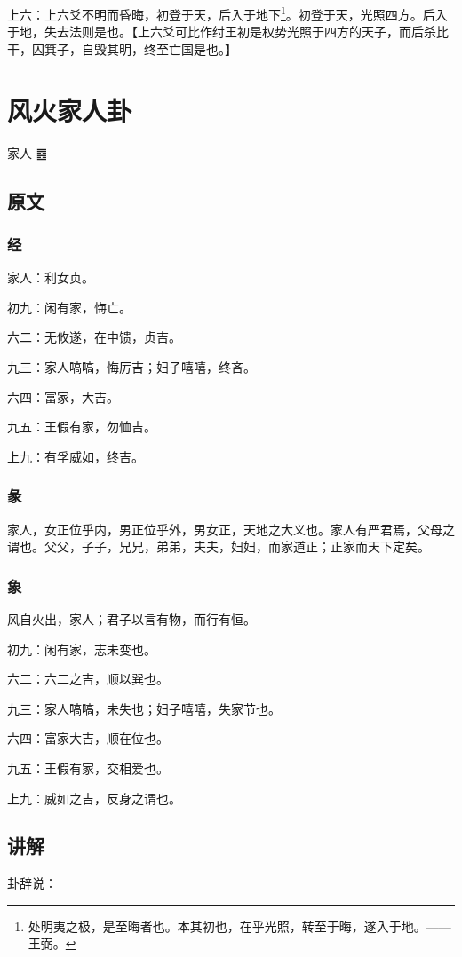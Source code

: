 \documentclass[12pt,oneside]{book}
\begin{document}
上六：上六爻不明而昏晦，初登于天，后入于地下\footnote{处明夷之极，是至晦者也。本其初也，在乎光照，转至于晦，遂入于地。——王弼。}。初登于天，光照四方。后入于地，失去法则是也。【上六爻可比作纣王初是权势光照于四方的天子，而后杀比干，囚箕子，自毁其明，终至亡国是也。】


\chapter{风火家人卦}
家人 {\Large ䷤}

\section{原文}

\subsection{经}
家人：利女贞。

初九：闲有家，悔亡。

六二：无攸遂，在中馈，贞吉。

九三：家人嗃嗃，悔厉吉；妇子嘻嘻，终吝。

六四：富家，大吉。

九五：王假有家，勿恤吉。

上九：有孚威如，终吉。

\subsection{彖}
家人，女正位乎内，男正位乎外，男女正，天地之大义也。家人有严君焉，父母之谓也。父父，子子，兄兄，弟弟，夫夫，妇妇，而家道正；正家而天下定矣。

\subsection{象}
风自火出，家人；君子以言有物，而行有恒。

初九：闲有家，志未变也。

六二：六二之吉，顺以巽也。

九三：家人嗃嗃，未失也；妇子嘻嘻，失家节也。

六四：富家大吉，顺在位也。

九五：王假有家，交相爱也。

上九：威如之吉，反身之谓也。

\section{讲解}
卦辞说：
\end{document}
